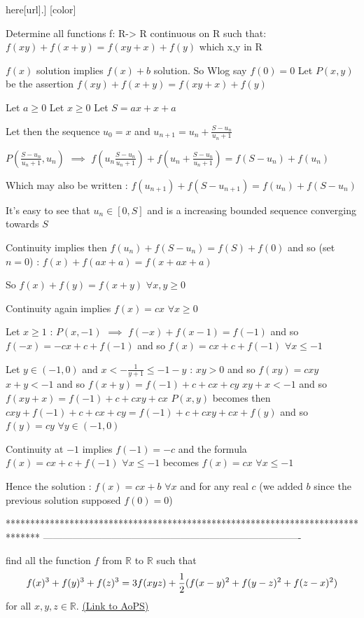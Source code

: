 \begin{solution}[by \href{https://artofproblemsolving.com/community/user/29428}{pco}]
	[color=#f00][mod edit: also posted [url=https:\/\/artofproblemsolving.com\/community\/c6h448405p2524160]here[\/url].]
[\/color]
\begin{tcolorbox}Determine all functions f: R-> R continuous on R such that:
$f(xy) + f(x+y) = f(xy+x) + f(y)$ which x,y in R\end{tcolorbox}
$f(x)$ solution implies $f(x)+b$ solution. So Wlog say $f(0)=0$
Let $P(x,y)$ be the assertion $f(xy)+f(x+y)=f(xy+x)+f(y)$

Let $a\ge 0$
Let $x\ge 0$
Let $S=ax+x+a$

Let then the sequence $u_0=x$ and $u_{n+1}=u_n+\frac{S-u_n}{u_n+1}$

$P(\frac{S-u_n}{u_n+1},u_n)$ $\implies$ $f(u_n\frac{S-u_n}{u_n+1})+f(u_n+\frac{S-u_n}{u_n+1})=f(S-u_n)+f(u_n)$

Which may also be written : $f(u_{n+1})+f(S-u_{n+1})=f(u_n)+f(S-u_n)$

It's easy to see that $u_n\in[0,S]$ and is a increasing bounded sequence converging towards $S$

Continuity implies then $f(u_n)+f(S-u_n)=f(S)+f(0)$ and so (set $n=0$) : $f(x)+f(ax+a)=f(x+ax+a)$

So $f(x)+f(y)=f(x+y)$ $\forall x,y\ge 0$

Continuity again implies $f(x)=cx$ $\forall x\ge 0$

Let $x\ge 1$ : $P(x,-1)$ $\implies$ $f(-x)+f(x-1)=f(-1)$ and so $f(-x)=-cx+c+f(-1)$ and so $f(x)=cx+c+f(-1)$ $\forall x\le -1$

Let $y\in(-1,0)$ and $x<-\frac 1{y+1}\le -1-y$ :
$xy>0$ and so $f(xy)=cxy$
$x+y<-1$ and so $f(x+y)=f(-1)+c+cx+cy$
$xy+x<-1$ and so $f(xy+x)=f(-1)+c+cxy+cx$
$P(x,y)$ becomes then $cxy+f(-1)+c+cx+cy=f(-1)+c+cxy+cx+f(y)$ and so $f(y)=cy$ $\forall y\in (-1,0)$

Continuity at $-1$ implies $f(-1)=-c$ and the formula $f(x)=cx+c+f(-1)$ $\forall x\le -1$ becomes $f(x)=cx$ $\forall x\le -1$

Hence the solution : $\boxed{f(x)=cx+b}$ $\forall x$ and for any real $c$ (we added $b$ since the previous solution supposed $f(0)=0$)
\end{solution}
*******************************************************************************
-------------------------------------------------------------------------------

\begin{problem}
	find all the function $f$ from $\mathbb{R}$ to $\mathbb{R}$ such that 
\[ f(x)^3+f(y)^3+f(z)^3\\
=3f(xyz)+\frac{1}{2}(f(x-y)^2+f(y-z)^2+f(z-x)^2)\] 
for all $x,y,z\in\mathbb{R}$.
	\flushright \href{https://artofproblemsolving.com/community/c6h434836}{(Link to AoPS)}
\end{problem}



